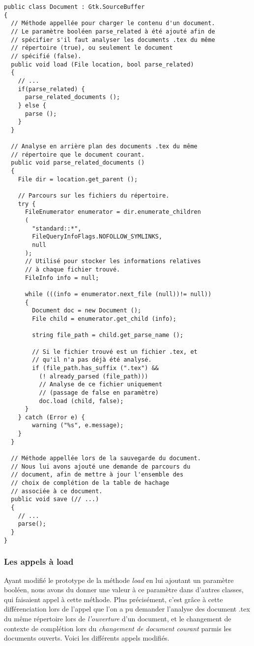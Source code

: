 \documentclass[a4paper,11pt]{report}
\begin{document}
\begin{lstlisting}[frame=single]
public class Document : Gtk.SourceBuffer
{
  // Méthode appellée pour charger le contenu d'un document.
  // Le paramètre booléen parse_related à été ajouté afin de
  // spécifier s'il faut analyser les documents .tex du même
  // répertoire (true), ou seulement le document
  // spécifié (false).
  public void load (File location, bool parse_related)
  {
    // ...
    if(parse_related) {
      parse_related_documents ();
    } else {
      parse ();
    }
  }
  
  // Analyse en arrière plan des documents .tex du même
  // répertoire que le document courant.
  public void parse_related_documents ()
  {
    File dir = location.get_parent ();
    
    // Parcours sur les fichiers du répertoire.
    try {
      FileEnumerator enumerator = dir.enumerate_children
      (
        "standard::*",
        FileQueryInfoFlags.NOFOLLOW_SYMLINKS, 
        null
      );
      // Utilisé pour stocker les informations relatives
      // à chaque fichier trouvé.
      FileInfo info = null;
          
      while (((info = enumerator.next_file (null))!= null))
      {
        Document doc = new Document ();
        File child = enumerator.get_child (info);
        
        string file_path = child.get_parse_name ();

        // Si le fichier trouvé est un fichier .tex, et
        // qu'il n'a pas déjà été analysé.
        if (file_path.has_suffix (".tex") && 
          (! already_parsed (file_path)))
          // Analyse de ce fichier uniquement
          // (passage de false en paramètre)
          doc.load (child, false);
      }
    } catch (Error e) {
        warning ("%s", e.message);
    }
  }

  // Méthode appellée lors de la sauvegarde du document.
  // Nous lui avons ajouté une demande de parcours du
  // document, afin de mettre à jour l'ensemble des
  // choix de complétion de la table de hachage
  // associée à ce document.
  public void save (// ...)
  {
    // ...
    parse();
  }
}
\end{lstlisting}

\subsubsection{Les appels à load}
\label{sssec:les_appels_à_load}
Ayant modifié le prototype de la méthode \textit{load} en lui ajoutant un paramètre booléen, nous avons du donner une valeur à ce paramètre dans d'autres classes, qui faisaient appel à cette méthode.
Plus précisément, c'est grâce à cette différenciation lors de l'appel que l'on a pu demander l'analyse des document .tex du même répertoire lors de \textit{l'ouverture} d'un document, et le changement de contexte de complétion lors du \textit{changement de document courant} parmis les documents ouverts.
Voici les différents appels modifiés.
\end{document}
